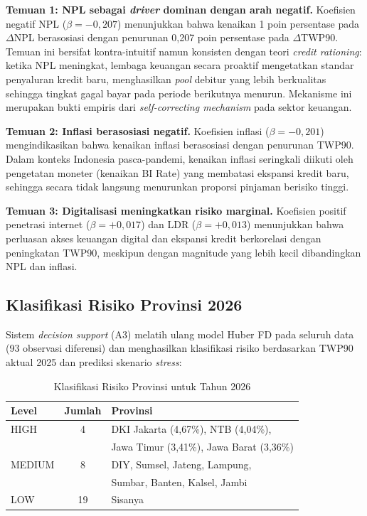 \documentclass[12pt,a4paper]{article}
\begin{document}
\textbf{Temuan 1: NPL sebagai \textit{driver} dominan dengan arah negatif.} Koefisien negatif NPL ($\beta = -0{,}207$) menunjukkan bahwa kenaikan 1 poin persentase pada $\Delta$NPL berasosiasi dengan penurunan 0,207 poin persentase pada $\Delta$TWP90. Temuan ini bersifat kontra-intuitif namun konsisten dengan teori \textit{credit rationing}: ketika NPL meningkat, lembaga keuangan secara proaktif mengetatkan standar penyaluran kredit baru, menghasilkan \textit{pool} debitur yang lebih berkualitas sehingga tingkat gagal bayar pada periode berikutnya menurun. Mekanisme ini merupakan bukti empiris dari \textit{self-correcting mechanism} pada sektor keuangan.

\textbf{Temuan 2: Inflasi berasosiasi negatif.} Koefisien inflasi ($\beta = -0{,}201$) mengindikasikan bahwa kenaikan inflasi berasosiasi dengan penurunan TWP90. Dalam konteks Indonesia pasca-pandemi, kenaikan inflasi seringkali diikuti oleh pengetatan moneter (kenaikan BI Rate) yang membatasi ekspansi kredit baru, sehingga secara tidak langsung menurunkan proporsi pinjaman berisiko tinggi.

\textbf{Temuan 3: Digitalisasi meningkatkan risiko marginal.} Koefisien positif penetrasi internet ($\beta = +0{,}017$) dan LDR ($\beta = +0{,}013$) menunjukkan bahwa perluasan akses keuangan digital dan ekspansi kredit berkorelasi dengan peningkatan TWP90, meskipun dengan magnitude yang lebih kecil dibandingkan NPL dan inflasi.

\subsection{Klasifikasi Risiko Provinsi 2026}

Sistem \textit{decision support} (A3) melatih ulang model Huber FD pada seluruh data (93 observasi diferensi) dan menghasilkan klasifikasi risiko berdasarkan TWP90 aktual 2025 dan prediksi skenario \textit{stress}:

\begin{table}[H]
\centering
\caption{Klasifikasi Risiko Provinsi untuk Tahun 2026}
\label{tab:risk}
\begin{tabular}{lcl}
\toprule
\textbf{Level} & \textbf{Jumlah} & \textbf{Provinsi} \\
\midrule
HIGH & 4 & DKI Jakarta (4,67\%), NTB (4,04\%), \\
 & & Jawa Timur (3,41\%), Jawa Barat (3,36\%) \\
MEDIUM & 8 & DIY, Sumsel, Jateng, Lampung, \\
 & & Sumbar, Banten, Kalsel, Jambi \\
LOW & 19 & Sisanya \\
\bottomrule
\end{tabular}
\end{table}
\end{document}
